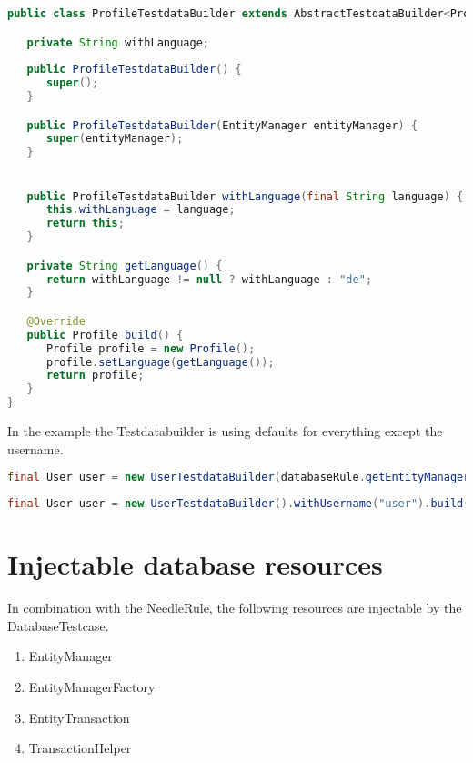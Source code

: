 \begin{lstlisting}[language={JAVA},caption=Profile Testdatabuilder]
public class ProfileTestdataBuilder extends AbstractTestdataBuilder<Profile> {

   private String withLanguage;
   
   public ProfileTestdataBuilder() {
      super();
   }

   public ProfileTestdataBuilder(EntityManager entityManager) {
      super(entityManager);
   }


   public ProfileTestdataBuilder withLanguage(final String language) {
      this.withLanguage = language;
      return this;
   }

   private String getLanguage() {
      return withLanguage != null ? withLanguage : "de";
   }

   @Override
   public Profile build() {
      Profile profile = new Profile();
      profile.setLanguage(getLanguage());
      return profile;
   }
}
\end{lstlisting}

In the example the Testdatabuilder is using defaults for everything except the username.

\begin{lstlisting}[language={JAVA},caption=Build an persistent User object]
final User user = new UserTestdataBuilder(databaseRule.getEntityManager()).withUsername("user").buildAndSave();
\end{lstlisting}

\begin{lstlisting}[language={JAVA},caption=Build an transient User object]
final User user = new UserTestdataBuilder().withUsername("user").build()
\end{lstlisting}

\section{Injectable database resources}

In combination with the NeedleRule, the following resources are injectable by the DatabaseTestcase.

\begin{enumerate}
\item EntityManager
\item EntityManagerFactory
\item EntityTransaction
\item TransactionHelper
\end{enumerate}

